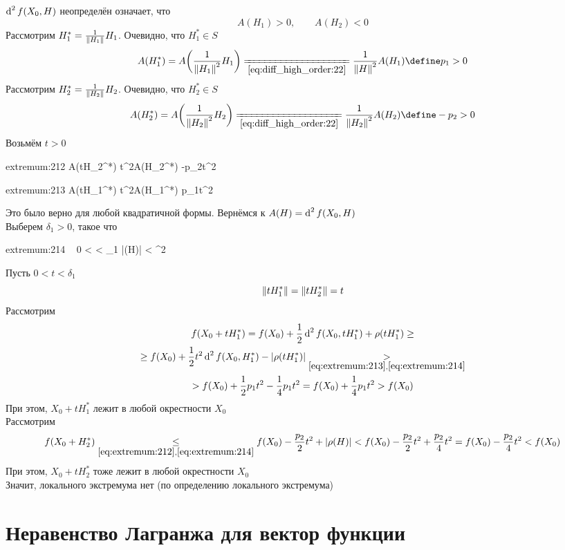 \begin{eproof}
	\item $ \di[2] f(X_0, H) $ неопределён означает, что
	$$ A(H_1) > 0, \qquad A(H_2) < 0 $$
	Рассмотрим $ H_1^* = \frac1{\norm{H_1}}H_1 $. Очевидно, что $ H_1^* \in S $
	$$ A(H_1^*) = A \bigg( \frac1{\norm{H_1}^2}H_1 \bigg) \undereq{\eref{diff_high_order:22}} \frac1{\norm{H}^2}A(H_1) \define p_1 > 0 $$
	Рассмотрим $ H_2^* = \frac1{\norm{H_2}}H_2 $. Очевидно, что $ H_2^* \in S $
	$$ A(H_2^*) = A \bigg( \frac1{\norm{H_2}^2}H_2 \bigg) \undereq{\eref{diff_high_order:22}} \frac1{\norm{H_2}^2}A(H_2) \define -p_2 > 0 $$
	Возьмём $ t > 0 $
	\begin{equ}{extremum:212}
		A(tH_2^*)  t^2A(H_2^*)  -p_2t^2
	\end{equ}
	\begin{equ}{extremum:213}
		A(tH_1^*)  t^2A(H_1^*)  p_1t^2
	\end{equ}
	Это было верно для любой квадратичной формы. Вернёмся к $ A(H) = \di[2] f(X_0, H) $ \\
	Выберем $ \delta_1 > 0 $, такое что
	\begin{equ}{extremum:214}
		\forall ~ 0 <  < \delta_1 \quad |\rho(H)| <  \min{} \cdot {}^2
	\end{equ}
	Пусть $ 0 < t < \delta_1 $
	$$ \norm{tH_1^*} = \norm{tH_2^*} = t $$
	Рассмотрим
	\begin{multline*}
		f(X_0 + tH_1^*) = f(X_0) + \half \di[2] f(X_0, tH_1^*) + \rho(tH_1^*) \ge \\
		\ge f(X_0) + \half t^2 \di[2] f(X_0, H_1^*) - |\rho(tH_1^*)| \underset{\eref{extremum:213}, \eref{extremum:214}}> \\
		> f(X_0) + \half p_1t^2 - \frac14 p_1t^2 = f(X_0) + \frac14 p_1t^2 > f(X_0)
	\end{multline*}
	При этом, $ X_0 + tH_1^* $ лежит в любой окрестности $ X_0 $ \\
	Рассмотрим
	$$ f(X_0 + H_2^*) \underset{\eref{extremum:212}, \eref{extremum:214}}\le f(X_0) - \half[p_2]t^2 + |\rho(H)| < f(X_0) - \half[p_2]t^2 + \frac{p_2}4t^2 = f(X_0) - \frac{p_2}4t^2 < f(X_0) $$
	При этом, $ X_0 + tH_2^* $ тоже лежит в любой окрестности $ X_0 $ \\
	Значит, локального экстремума нет (по определению локального экстремума)
\end{eproof}

\section{Неравенство Лагранжа для вектор функции}


